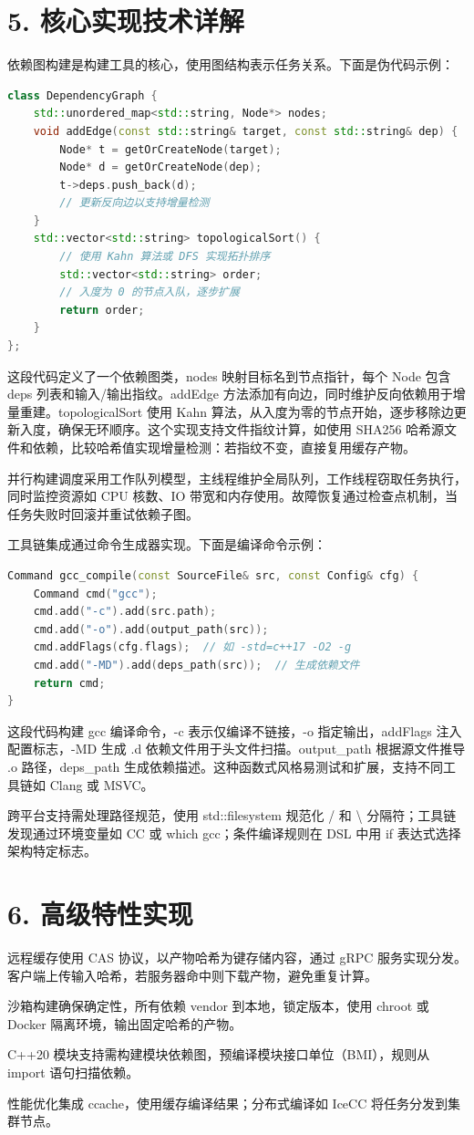 \chapter{5. 核心实现技术详解}
依赖图构建是构建工具的核心，使用图结构表示任务关系。下面是伪代码示例：\par
\begin{lstlisting}[language=cpp]
class DependencyGraph {
    std::unordered_map<std::string, Node*> nodes;
    void addEdge(const std::string& target, const std::string& dep) {
        Node* t = getOrCreateNode(target);
        Node* d = getOrCreateNode(dep);
        t->deps.push_back(d);
        // 更新反向边以支持增量检测
    }
    std::vector<std::string> topologicalSort() {
        // 使用 Kahn 算法或 DFS 实现拓扑排序
        std::vector<std::string> order;
        // 入度为 0 的节点入队，逐步扩展
        return order;
    }
};
\end{lstlisting}
这段代码定义了一个依赖图类，nodes 映射目标名到节点指针，每个 Node 包含 deps 列表和输入/输出指纹。addEdge 方法添加有向边，同时维护反向依赖用于增量重建。topologicalSort 使用 Kahn 算法，从入度为零的节点开始，逐步移除边更新入度，确保无环顺序。这个实现支持文件指纹计算，如使用 SHA256 哈希源文件和依赖，比较哈希值实现增量检测：若指纹不变，直接复用缓存产物。\par
并行构建调度采用工作队列模型，主线程维护全局队列，工作线程窃取任务执行，同时监控资源如 CPU 核数、IO 带宽和内存使用。故障恢复通过检查点机制，当任务失败时回滚并重试依赖子图。\par
工具链集成通过命令生成器实现。下面是编译命令示例：\par
\begin{lstlisting}[language=cpp]
Command gcc_compile(const SourceFile& src, const Config& cfg) {
    Command cmd("gcc");
    cmd.add("-c").add(src.path);
    cmd.add("-o").add(output_path(src));
    cmd.addFlags(cfg.flags);  // 如 -std=c++17 -O2 -g
    cmd.add("-MD").add(deps_path(src));  // 生成依赖文件
    return cmd;
}
\end{lstlisting}
这段代码构建 gcc 编译命令，-c 表示仅编译不链接，-o 指定输出，addFlags 注入配置标志，-MD 生成 .d 依赖文件用于头文件扫描。output\_{}path 根据源文件推导 .o 路径，deps\_{}path 生成依赖描述。这种函数式风格易测试和扩展，支持不同工具链如 Clang 或 MSVC。\par
跨平台支持需处理路径规范，使用 std::filesystem 规范化 / 和 \textbackslash{} 分隔符；工具链发现通过环境变量如 CC 或 which gcc；条件编译规则在 DSL 中用 if 表达式选择架构特定标志。\par
\chapter{6. 高级特性实现}
远程缓存使用 CAS 协议，以产物哈希为键存储内容，通过 gRPC 服务实现分发。客户端上传输入哈希，若服务器命中则下载产物，避免重复计算。\par
沙箱构建确保确定性，所有依赖 vendor 到本地，锁定版本，使用 chroot 或 Docker 隔离环境，输出固定哈希的产物。\par
C++20 模块支持需构建模块依赖图，预编译模块接口单位（BMI），规则从 import 语句扫描依赖。\par
性能优化集成 ccache，使用缓存编译结果；分布式编译如 IceCC 将任务分发到集群节点。\par
